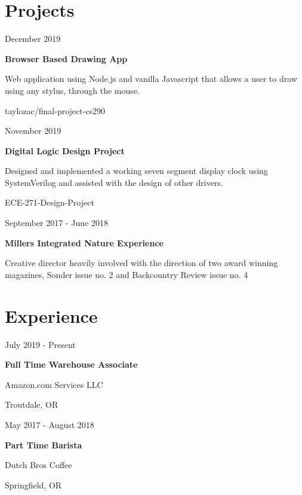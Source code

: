\documentclass[12pt,letterpaper]{article}
\begin{document}
	\begin{minipage}[t]{0.45\linewidth}

    \raggedright
    
    \section*{Projects}
    
    December 2019
    
    \textbf{Browser Based Drawing App}
    
    Web application using Node.js and vanilla Javascript that allows a user to draw using any
    stylus, through the mouse.
    
     \faGithub 
    \hspace{0.15cm} taylozac/final-project-cs290
    
    \vspace{0.5cm}
    
    November 2019
    
    \textbf{Digital Logic Design Project}
    
    Designed and implemented a working seven segment display clock using SystemVerilog and assisted with the design of other drivers.
    
    \faGithub 
    \hspace{0.15cm} ECE-271-Design-Project

    \vspace{0.5cm}
    
    September 2017 - June 2018
    
    \textbf{Millers Integrated Nature Experience}
    
    Creative director heavily involved with the direction of two award winning magazines, Sonder issue no. 2 and Backcountry Review issue no. 4
    

	\section*{Experience}
	July 2019 - Present
	
	\textbf{Full Time Warehouse Associate}
	
	Amazon.com Services LLC

	Troutdale, OR

	\hspace{1cm}
	
	May 2017 - August 2018 
	
	\textbf{Part Time Barista}

	Dutch Bros Coffee 

	Springfield, OR 
	
	\end{minipage}
\end{document}
